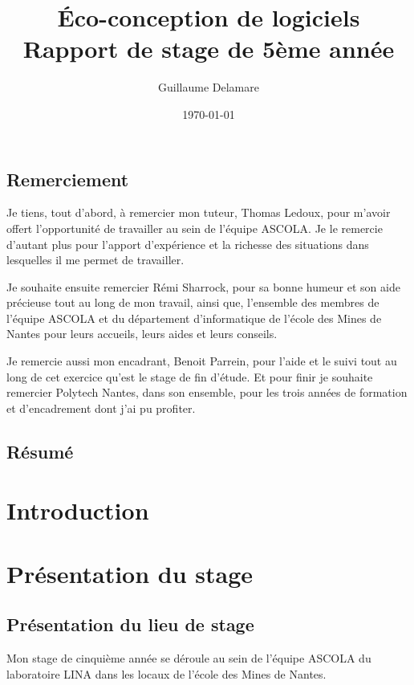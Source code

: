 \documentclass[a4paper, 11pt]{report}
\title{Éco-conception de logiciels\\ \large Rapport de stage de 5ème année}
\author{Guillaume Delamare}
\date{\today}
\begin{document}
\renewcommand{\labelitemi}{$\bullet$}
\renewcommand{\labelitemii}{$\diamond$}
\renewcommand{\labelitemiii}{$\ast$}
\renewcommand{\labelitemiv}{$\cdot$}

\maketitle

\section*{Remerciement}

Je tiens, tout d'abord, à remercier mon tuteur, Thomas Ledoux, pour m'avoir offert l'opportunité de travailler au sein de l'équipe ASCOLA. Je le remercie d'autant plus pour l'apport d'expérience et la richesse des situations dans lesquelles il me permet de travailler.

Je souhaite ensuite remercier Rémi Sharrock, pour sa bonne humeur et son aide précieuse tout au long de mon travail, ainsi que, l'ensemble des membres de l'équipe ASCOLA et du département d'informatique de l'école des Mines de Nantes pour leurs accueils, leurs aides et leurs conseils.

Je remercie aussi mon encadrant, Benoit Parrein, pour l'aide et le suivi tout au long de cet exercice qu'est le stage de fin d'étude. Et pour finir je souhaite remercier Polytech Nantes, dans son ensemble, pour les trois années de formation et d'encadrement dont j'ai pu profiter.

\newpage

\section*{Résumé}

\newpage

\tableofcontents

\chapter{Introduction}

\chapter{Présentation du stage}
	\section{Présentation du lieu de stage}
Mon stage de cinquième année se déroule au sein de l’équipe ASCOLA du laboratoire LINA dans les locaux de l’école des Mines de Nantes.
\end{document}
